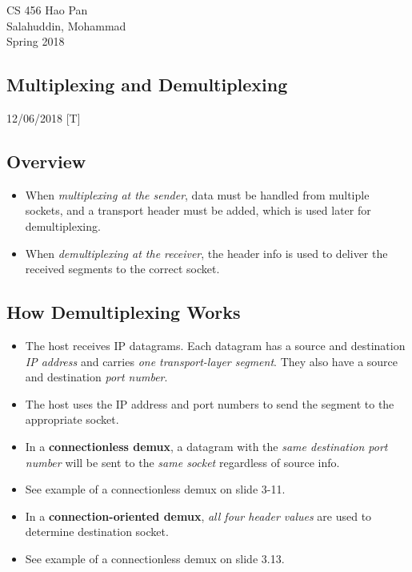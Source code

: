 \documentclass{article}
\begin{document}
\noindent
{CS 456 \hfill Hao Pan}\\
{Salahuddin, Mohammad}\\
{Spring 2018}


\begin{center}
\section{Multiplexing and Demultiplexing}
\noindent
{\hfill 12/06/2018 [T]}
\end{center}

\subsection{Overview}

\begin{itemize}
\item When \emph{multiplexing at the sender}, data must be handled from multiple sockets, and a transport header must be added, which is used later for demultiplexing.
\item When \emph{demultiplexing at the receiver}, the header info is used to deliver the received segments to the correct socket.
\end{itemize}

\subsection{How Demultiplexing Works}

\begin{itemize}
\item The host receives IP datagrams. Each datagram has a source and destination \emph{IP address} and carries \emph{one transport-layer segment}. They also have a source and destination \emph{port number}.
\item The host uses the IP address and port numbers to send the segment to the appropriate socket.
\item In a {\bf connectionless demux}, a datagram with the \emph{same destination port number} will be sent to the \emph{same socket} regardless of source info.
\item See example of a connectionless demux on slide 3-11.
\item In a {\bf connection-oriented demux}, \emph{all four header values} are used to determine destination socket.
\item See example of a connectionless demux on slide 3.13.
\end{itemize}
\end{document}
